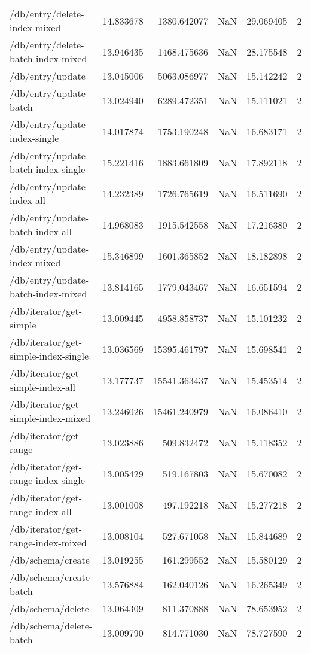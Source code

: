 \begin{longtable}{lrrrrr}
/db/entry/delete-index-mixed & 14.833678 & 1380.642077 & NaN & 29.069405 & 2 \\
/db/entry/delete-batch-index-mixed & 13.946435 & 1468.475636 & NaN & 28.175548 & 2 \\
/db/entry/update & 13.045006 & 5063.086977 & NaN & 15.142242 & 2 \\
/db/entry/update-batch & 13.024940 & 6289.472351 & NaN & 15.111021 & 2 \\
/db/entry/update-index-single & 14.017874 & 1753.190248 & NaN & 16.683171 & 2 \\
/db/entry/update-batch-index-single & 15.221416 & 1883.661809 & NaN & 17.892118 & 2 \\
/db/entry/update-index-all & 14.232389 & 1726.765619 & NaN & 16.511690 & 2 \\
/db/entry/update-batch-index-all & 14.968083 & 1915.542558 & NaN & 17.216380 & 2 \\
/db/entry/update-index-mixed & 15.346899 & 1601.365852 & NaN & 18.182898 & 2 \\
/db/entry/update-batch-index-mixed & 13.814165 & 1779.043467 & NaN & 16.651594 & 2 \\
/db/iterator/get-simple & 13.009445 & 4958.858737 & NaN & 15.101232 & 2 \\
/db/iterator/get-simple-index-single & 13.036569 & 15395.461797 & NaN & 15.698541 & 2 \\
/db/iterator/get-simple-index-all & 13.177737 & 15541.363437 & NaN & 15.453514 & 2 \\
/db/iterator/get-simple-index-mixed & 13.246026 & 15461.240979 & NaN & 16.086410 & 2 \\
/db/iterator/get-range & 13.023886 & 509.832472 & NaN & 15.118352 & 2 \\
/db/iterator/get-range-index-single & 13.005429 & 519.167803 & NaN & 15.670082 & 2 \\
/db/iterator/get-range-index-all & 13.001008 & 497.192218 & NaN & 15.277218 & 2 \\
/db/iterator/get-range-index-mixed & 13.008104 & 527.671058 & NaN & 15.844689 & 2 \\
/db/schema/create & 13.019255 & 161.299552 & NaN & 15.580129 & 2 \\
/db/schema/create-batch & 13.576884 & 162.040126 & NaN & 16.265349 & 2 \\
/db/schema/delete & 13.064309 & 811.370888 & NaN & 78.653952 & 2 \\
/db/schema/delete-batch & 13.009790 & 814.771030 & NaN & 78.727590 & 2 \\

\end{longtable}
